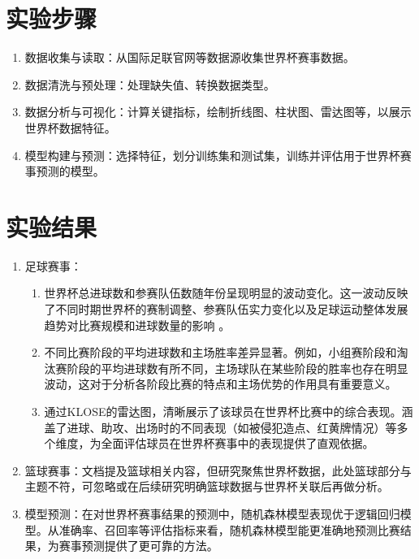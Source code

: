 \documentclass{beamer}
\begin{document}
	\section{实验步骤}
	\begin{frame}
		\begin{enumerate}[label=\arabic*.]
			\item 数据收集与读取：从国际足联官网等数据源收集世界杯赛事数据。
			\item 数据清洗与预处理：处理缺失值、转换数据类型。
			\item 数据分析与可视化：计算关键指标，绘制折线图、柱状图、雷达图等，以展示世界杯数据特征。
			\item 模型构建与预测：选择特征，划分训练集和测试集，训练并评估用于世界杯赛事预测的模型。
		\end{enumerate}
	\end{frame}
	
	\section{实验结果}
	\begin{frame}
		\begin{enumerate}[label=\arabic*.]
			\item 足球赛事：
			\begin{enumerate}[label=\arabic{*}.]
				\item 世界杯总进球数和参赛队伍数随年份呈现明显的波动变化。这一波动反映了不同时期世界杯的赛制调整、参赛队伍实力变化以及足球运动整体发展趋势对比赛规模和进球数量的影响 。
				\item 不同比赛阶段的平均进球数和主场胜率差异显著。例如，小组赛阶段和淘汰赛阶段的平均进球数有所不同，主场球队在某些阶段的胜率也存在明显波动，这对于分析各阶段比赛的特点和主场优势的作用具有重要意义。
				\item 通过KLOSE的雷达图，清晰展示了该球员在世界杯比赛中的综合表现。涵盖了进球、助攻、出场时的不同表现（如被侵犯造点、红黄牌情况）等多个维度，为全面评估球员在世界杯赛事中的表现提供了直观依据。
			\end{enumerate}
			\item 篮球赛事：文档提及篮球相关内容，但研究聚焦世界杯数据，此处篮球部分与主题不符，可忽略或在后续研究明确篮球数据与世界杯关联后再做分析。
			\item 模型预测：在对世界杯赛事结果的预测中，随机森林模型表现优于逻辑回归模型。从准确率、召回率等评估指标来看，随机森林模型能更准确地预测比赛结果，为赛事预测提供了更可靠的方法。
		\end{enumerate}
	\end{frame}
	
\end{document}
